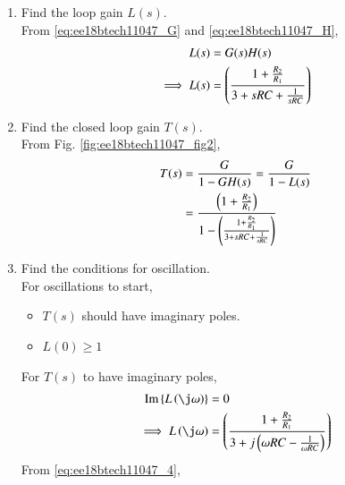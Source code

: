 \begin{enumerate}[label=\arabic*.,ref=\theenumi]
%
\item Find the loop gain $L(s)$.\\
\solution 
From \eqref{eq:ee18btech11047_G}
and \eqref{eq:ee18btech11047_H},
\begin{align}
L(s) &= G(s)H(s)
\\
\implies L(s) &= \brak{\frac{1+\frac{R_{2}}{R_{1}}}{3+sRC+\frac{1}{sRC}}}
\label{eq:ee18btech11047_4}
\end{align}
%
\item Find the closed loop gain $T(s)$.
\\
\solution From Fig. \ref{fig:ee18btech11047_fig2},
%
\begin{align}
T(s) &= \frac{G}{1-GH(s)}=\frac{G}{1-L(s)}
\\
&= \frac{\left(1+\frac{R_2}{R_1}\right)}{1-\left(\frac{1+\frac{R_{2}}{R_{1}}}{3+sRC+\frac{1}{sRC}}\right)}
\end{align}
\item Find the conditions for oscillation.\\
\solution For oscillations to start, 
\begin{itemize}
    \item $T(s)$ should have imaginary poles.
    \item $L(0) \ge 1$
\end{itemize}
%
For $T(s)$ to have imaginary poles, 
\begin{align}
\text{Im}\cbrak{L\brak{\j \omega}} &= 0
\\
\implies L\brak{\j\omega}&= \brak{\frac{1+\frac{R_{2}}{R_{1}}}{3+ j \brak{\omega RC-\frac{1}{\omega RC}}}}
\end{align}
From \eqref{eq:ee18btech11047_4},


\end{enumerate}
